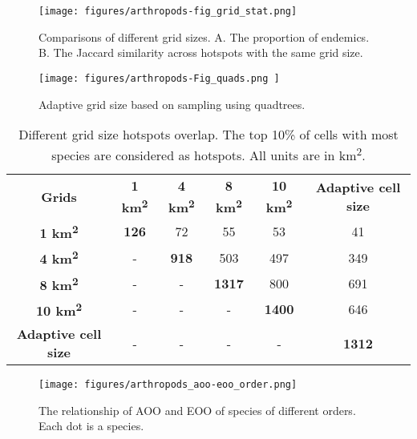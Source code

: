    \begin{figure}[htp!]
      \centering
      \texttt{[image: figures/arthropods-fig\_grid\_stat.png]}
      \caption[Comparisons of proportions of endemics across grid sizes hotspots]{Comparisons of different grid sizes. A. The proportion of endemics. B. The Jaccard similarity across hotspots with the same grid size.}
      \label{fig:arthropods-different-hotposts-stat}
   \end{figure}


   \begin{figure}[htp!]
      \centering
      \texttt{[image: figures/arthropods-Fig\_quads.png ]}
      \caption[Adaptive grid size based on sampling using quadtrees]{Adaptive grid size based on sampling using quadtrees.}
      \label{fig:arthropods-figS5}
   \end{figure}

\begin{table}[]
    \caption{Different grid size hotspots overlap. The top 10\% of cells with most species are considered as hotspots. All units are in km\textsuperscript{2}.}
\begin{tabular}{cccccc}
\textbf{Grids}              & \textbf{1 km\textsuperscript{2}} & \textbf{4 km\textsuperscript{2}} & \textbf{8 km\textsuperscript{2}} & \textbf{10 km\textsuperscript{2}} & \textbf{Adaptive cell size} \\
\textbf{1 km\textsuperscript{2}}              & \textbf{126}   & 72             & 55             & 53              & 41                          \\
\textbf{4 km\textsuperscript{2}}              & -              & \textbf{918}   & 503            & 497             & 349                         \\
\textbf{8 km\textsuperscript{2}}              & -              & -              & \textbf{1317}  & 800             & 691                         \\
\textbf{10 km\textsuperscript{2}}             & -              & -              & -              & \textbf{1400}   & 646                         \\
\textbf{Adaptive cell size} & -              & -              & -              & -               & \textbf{1312}              
\end{tabular}
\label{table:arthropods-tableS2}
\end{table}


   \begin{figure}[htp!]
      \centering
      \texttt{[image: figures/arthropods\_aoo-eoo\_order.png]}
      \caption[AOO, EOO relationship per order]{The relationship of AOO and EOO of species of different orders. Each dot is a species. }
      \label{fig:arthropods-eoo-aoo}
   \end{figure}



